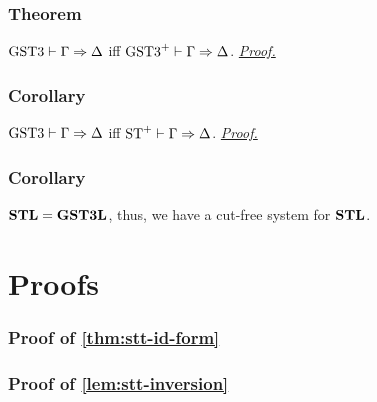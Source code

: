 \documentclass[a4paper, 12pt]{paper}
\begin{document}
\section{Theorem}\label{thm:gstt-eq-gsttp} $\text{GST3} \vdash \Gamma \Rightarrow \Delta$ iff $\text{GST3}^+ \vdash \Gamma \Rightarrow \Delta$. \hyperref[pr:gstt-eq-gsttp]{\emph{Proof.}}



\section{Corollary}\label{thm:gstt-eq-stp} $\text{GST3} \vdash \Gamma \Rightarrow \Delta$ iff $\text{ST}^+ \vdash \Gamma \Rightarrow \Delta$. \hyperref[pr:gstt-eq-stp]{\emph{Proof.}}



\section{Corollary} $\mathbf{STL} = \mathbf{GST3L}$, thus, we have a cut-free system for $\mathbf{STL}$.


\pagebreak

\part*{Proofs}
\setcounter{section}{0}

\section{Proof of \ref{thm:stt-id-form}}\label{pr:stt-id-form}



\section{Proof of \ref{lem:stt-inversion}}\label{pr:stt-inversion} 
\end{document}
